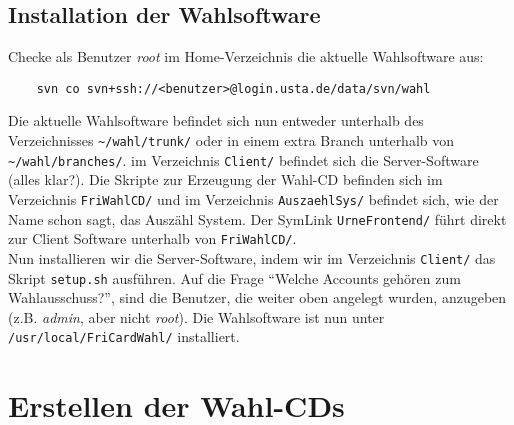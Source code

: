 \documentclass[a4paper,10pt]{article}
\begin{document}
\subsection{Installation der Wahlsoftware}
Checke als Benutzer \textit{root} im Home-Verzeichnis die aktuelle Wahlsoftware aus:
\begin{verbatim}
	svn co svn+ssh://<benutzer>@login.usta.de/data/svn/wahl
\end{verbatim} 
Die aktuelle Wahlsoftware befindet sich nun entweder unterhalb des Verzeichnisses \texttt{\textasciitilde/wahl/trunk/} oder in einem extra Branch unterhalb von \texttt{\textasciitilde/wahl/branches/}.
im Verzeichnis \texttt{Client/} befindet sich die Server-Software (alles klar?). Die Skripte zur Erzeugung der Wahl-CD befinden sich im Verzeichnis \texttt{FriWahlCD/} und im Verzeichnis \texttt{AuszaehlSys/} befindet sich, wie der Name schon sagt, das Auszähl System. Der SymLink \texttt{UrneFrontend/} führt direkt zur Client Software unterhalb von \texttt{FriWahlCD/}. \\
Nun installieren wir die Server-Software, indem wir im Verzeichnis \texttt{Client/} das Skript \texttt{setup.sh} ausführen. Auf die Frage ``Welche Accounts gehören zum Wahlausschuss?'', sind die Benutzer, die weiter oben angelegt wurden, anzugeben (z.B. \textit{admin}, aber nicht \textit{root}). Die Wahlsoftware ist nun unter \texttt{/usr/local/FriCardWahl/} installiert.

\newpage
\section{Erstellen der Wahl-CDs}
\end{document}
